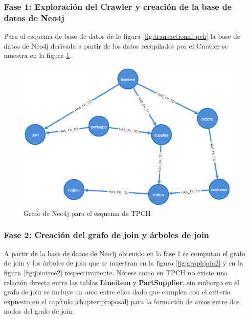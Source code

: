 \subsubsection{Fase 1: Exploraci\'on del Crawler y creaci\'on de la base de datos de Neo4j}

Para el esquema de base de datos de la figura \ref{fig:transactionaltpch} la base de datos de Neo4j derivada a 
partir de los datos recopilados por el Crawler se muestra en la figura \ref{fig:catalogexp2}.

\begin{figure}
  \centering
  \includegraphics[scale=0.4]{Graphics/graph (2).png}
  \caption{Grafo de Neo4j para el esquema de TPCH}
  \label{fig:catalogexp2}
\end{figure}

\subsubsection{Fase 2: Creaci\'on del grafo de join y \'arboles de join}

A partir de la base de datos de Neo4j obtenido en la fase 1 se computan el grafo de join y los \'arboles de 
join que se muestran en la figura \ref{fig:graphjoin2} y en la figura \ref{fig:jointree2} respectivamente. 
N\'otese como en TPCH no existe una relaci\'on directa entre las tablas \textbf{Lineitem} y \textbf{PartSupplier}, 
sin embargo en el grafo de join se incluye un arco entre ellos dado que cumplen con el criterio expuesto 
en el cap\'itulo \ref{chapter:proposal} para la formaci\'on de arcos entre dos nodos del grafo de join.


